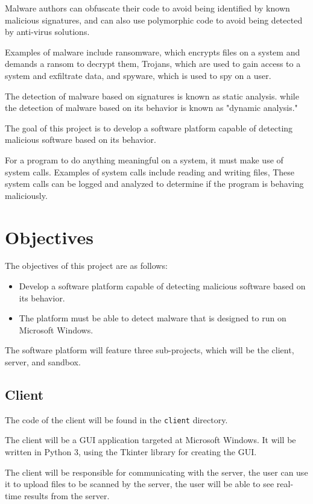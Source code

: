 Malware authors can obfuscate their code to avoid being identified by known malicious signatures,
and can also use polymorphic code to avoid being detected by anti-virus solutions.

Examples of malware include ransomware, which encrypts files on a system and demands a ransom to decrypt them,
Trojans, which are used to gain access to a system and exfiltrate data,
and spyware, which is used to spy on a user.

The detection of malware based on signatures is known as static analysis.
while the detection of malware based on its behavior is known as "dynamic analysis."

The goal of this project is to develop a software platform capable of detecting malicious software based on its behavior.

For a program to do anything meaningful on a system, it must make use of system calls.
Examples of system calls include reading and writing files,
These system calls can be logged and analyzed to determine if the program is behaving maliciously.

\section{Objectives}
The objectives of this project are as follows:
\begin{itemize}
    \item Develop a software platform capable of detecting malicious software based on its behavior.
    \item The platform must be able to detect malware that is designed to run on Microsoft Windows.
\end{itemize}

The software platform will feature three sub-projects, which will be the client, server, and sandbox.

\subsection{Client}
The code of the client will be found in the \texttt{client} directory.

The client will be a GUI application targeted at Microsoft Windows.
It will be written in Python 3, using the Tkinter library for creating the GUI.

The client will be responsible for communicating with the server,
the user can use it to upload files to be scanned by the server,
the user will be able to see real-time results from the server.

